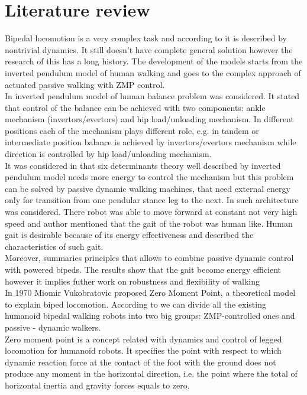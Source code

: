 \documentclass[11pt,a4paper]{article}
\begin{document}
\section{Literature review}
Bipedal locomotion is a very complex task and according to \cite{erbatur2002study} it is described by nontrivial dynamics. It still doesn't have complete general solution however the research of this has a long history. The development of the models starts from the inverted pendulum model of human walking and goes to the complex approach of actuated passive walking with ZMP control.\\
In \cite{winter1995human} inverted pendulum model of human balance problem was considered. It stated that control of the balance can be achieved with two components: ankle mechanism (invertors/evertors) and hip load/unloading mechanism. In different positions each of the mechanism plays different role, e.g. in tandem or intermediate position balance is achieved by invertors/evertors mechanism while direction is controlled by hip load/unloading mechanism.\\
It was considered in \cite{kuo2007six} that six determinants theory\cite{inman1953major} well described by inverted pendulum model  needs more energy to control the mechanism but this problem can be solved by passive dynamic walking machines, that need external energy only for transition from one pendular stance leg to the next. In \cite{collins2005bipedal} such architecture was considered. There robot was able to move forward at constant not very high speed and author mentioned that the gait of the robot was human like. Human gait is desirable because of its energy effectiveness and \cite{golliday1977approach} described the characteristics of such gait.\\
Moreover, \cite{anderson2005powered} summaries principles that allows to combine passive dynamic control with powered bipeds. The results show that the gait become energy efficient however it implies futher work on robustness and flexibility of walking\\ 
In 1970 Miomir Vukobratovic proposed Zero Moment Point, a theoretical model to explain biped locomotion.
According to \cite{manchester2011stable} we can divide all the existing humanoid bipedal walking robots into two big groups: ZMP-controlled ones and passive - dynamic walkers.\\
Zero moment point is a concept related with dynamics and control of legged locomotion for humanoid robots. It specifies the point with respect to which dynamic reaction force at the contact of the foot with the ground does not produce any moment in the horizontal direction, i.e. the point where the total of horizontal inertia and gravity forces equals to zero.
\end{document}
